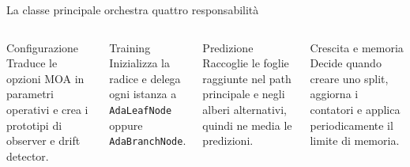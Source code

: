 \documentclass[aspectratio=169,10pt]{beamer}
\begin{document}
\begin{frame}{La classe principale orchestra quattro responsabilità}
  \begin{columns}[T]
    \begin{block}{Configurazione}
      \small
      Traduce le opzioni MOA in parametri operativi e crea i prototipi
      di observer e drift detector.
    \end{block}

    \begin{block}{Training}
      \small
      Inizializza la radice e delega ogni istanza a
      \texttt{AdaLeafNode} oppure \texttt{AdaBranchNode}.
    \end{block}

    \begin{block}{Predizione}
      \small
      Raccoglie le foglie raggiunte nel path principale e negli alberi
      alternativi, quindi ne media le predizioni.
    \end{block}

    \begin{alertblock}{Crescita e memoria}
      \small
      Decide quando creare uno split, aggiorna i contatori e applica
      periodicamente il limite di memoria.
    \end{alertblock}
  \end{columns}
\end{frame}
\end{document}
